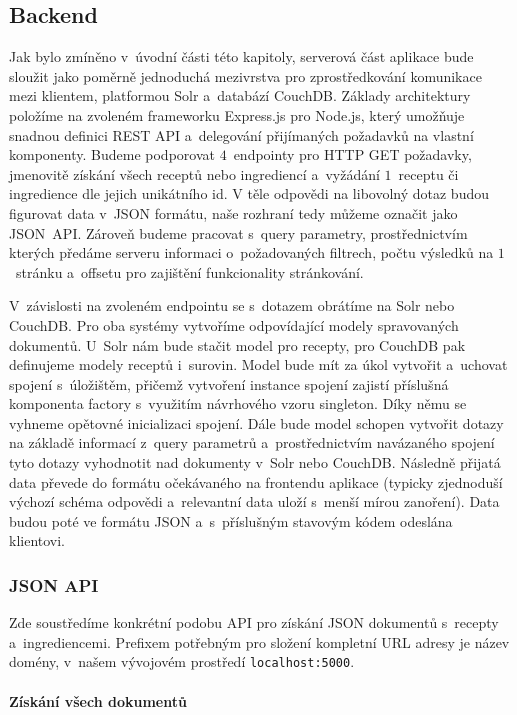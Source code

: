 \subsection{Backend}

Jak bylo zmíněno v~úvodní části této kapitoly, serverová část aplikace bude sloužit jako poměrně jednoduchá mezivrstva pro zprostředkování komunikace mezi klientem, platformou Solr a~databází CouchDB. Základy architektury položíme na zvoleném frameworku Express.js pro Node.js, který umožňuje snadnou definici REST API a~delegování přijímaných požadavků na vlastní komponenty. Budeme podporovat $4$~endpointy pro HTTP GET požadavky, jmenovitě získání všech receptů nebo ingrediencí a~vyžádání $1$~receptu či ingredience dle jejich unikátního id. V těle odpovědi na libovolný dotaz budou figurovat data v~JSON formátu, naše rozhraní tedy můžeme označit jako JSON~API. Zároveň budeme pracovat s~query parametry, prostřednictvím kterých předáme serveru informaci o~požadovaných filtrech, počtu výsledků na $1$~stránku a~offsetu pro zajištění funkcionality stránkování.

V~závislosti na zvoleném endpointu se s~dotazem obrátíme na Solr nebo \,CouchDB. Pro oba systémy vytvoříme odpovídající modely spravovaných dokumentů. U~Solr nám bude stačit model pro recepty, pro CouchDB pak definujeme modely receptů i~surovin. Model bude mít za úkol vytvořit a~uchovat spojení s~úložištěm, přičemž vytvoření instance spojení zajistí příslušná komponenta factory s~využitím návrhového vzoru singleton. Díky němu se vyhneme opětovné inicializaci spojení. Dále bude model schopen vytvořit dotazy na základě informací z~query parametrů a~prostřednictvím navázaného spojení tyto dotazy vyhodnotit nad dokumenty v~Solr nebo CouchDB. Následně přijatá data převede do formátu očekávaného na frontendu aplikace (typicky zjednoduší výchozí schéma odpovědi a~relevantní data uloží s~menší mírou zanoření). Data budou poté ve formátu JSON a~s~příslušným stavovým kódem odeslána klientovi. 

\subsubsection{JSON API}

Zde soustředíme konkrétní podobu API pro získání JSON dokumentů s~recepty a~ingrediencemi. Prefixem potřebným pro složení kompletní URL adresy je název domény, v~našem vývojovém prostředí \texttt{localhost:5000}.

\paragraph{Získání všech dokumentů}\mbox{}\\

